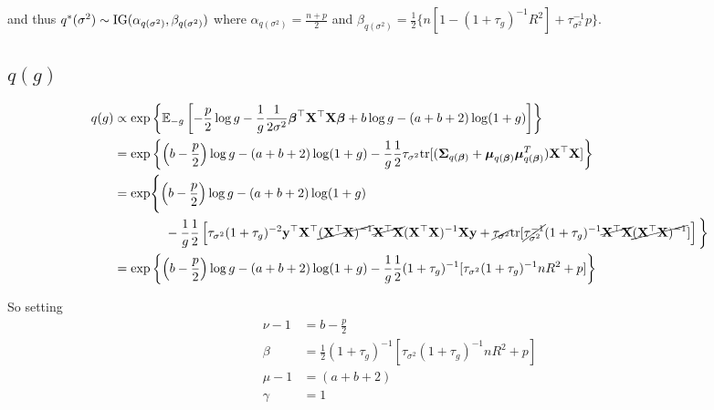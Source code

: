 \documentclass{amsart}[12pt]
\theoremstyle{definition}
\begin{document}
and thus $q^*(\sigma^2) \sim \text{IG}(\alpha_{q(\sigma^2)}, \beta_{q(\sigma^2)})$ where
$\alpha_{q(\sigma^2)} = \frac{n + p}{2}$ and $\beta_{q(\sigma^2)} = \frac{1}{2} \{n[1 - (1 + \tau_g)^{-1}  R^2] + \tau_{\sigma^2}^{-1} p \}$.

\subsection{$q(g)$}
\begin{align*}
	q(g) & \propto \exp \left\{ \mathbb{E}_{-g} \left[-\frac{p}{2} \log g - \frac{1}{g} \frac{1}{2 \sigma^2} {\boldsymbol \beta}^\top {\bf X}^\top {\bf X} {\boldsymbol\beta} + b \log g - (a + b + 2) \log(1 + g) \right] \right\}                                                                                                                                                               \\
	     & = \exp \left \{ \left(b - \frac{p}{2}\right) \log g  - (a + b + 2) \log(1 + g) - \frac{1}{g} \frac{1}{2} \tau_{\sigma^2} \text{tr}[({\boldsymbol \Sigma}_{q({\boldsymbol \beta})} + {\boldsymbol \mu}_{q({\boldsymbol \beta})} {\boldsymbol \mu}_{q({\boldsymbol \beta})}^T) {\bf X}^\top {\bf X}] \right \}                                                                                                                              \\
	     & = \exp \Biggl \{ \left(b - \frac{p}{2}\right) \log g - (a + b + 2) \log(1 + g)                                                                                                                                                                                                                                                                \\
	     & \quad \quad \qquad  - \frac{1}{g} \frac{1}{2} \left[\tau_{\sigma^2} (1 + \tau_g)^{-2} {\bf y}^\top {\bf X}^\top \cancel{({\bf X}^\top {\bf X})^{-1}} \cancel{{\bf X}^\top {\bf X}} ({\bf X}^\top {\bf X})^{-1} {\bf X} {\bf y} + \cancel{\tau_{\sigma^2}} \text{tr}{[\cancel{\tau_{\sigma^2}^{-1}} (1 + \tau_g)^{-1} \cancel{{\bf X}^\top {\bf X}} \cancel{({\bf X}^\top {\bf X})^{-1}}]} \right]	\biggl \} \\
	     & = \exp \left \{ \left(b - \frac{p}{2}\right) \log g - (a + b + 2) \log(1 + g) - \frac{1}{g} \frac{1}{2} (1 + \tau_g)^{-1} [\tau_{\sigma^2} (1 + \tau_g)^{-1} n R^2 + p]                                                                                                                                                                       
	\right \}
\end{align*}

So setting
\begin{align*}
	\nu - 1 & = b - \frac{p}{2}                                                             \\
	\beta   & = \frac{1}{2} (1 + \tau_g)^{-1} [\tau_{\sigma^2} (1 + \tau_g)^{-1} n R^2 + p] \\
	\mu - 1 & = (a + b + 2)                                                                 \\
	\gamma  & = 1                                                                           
\end{align*}
\end{document}
